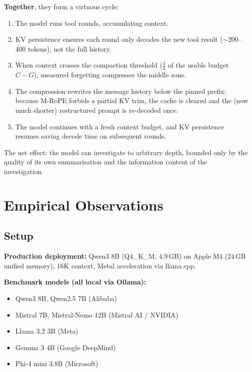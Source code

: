 \documentclass[11pt,a4paper]{article}
\begin{document}
\textbf{Together}, they form a virtuous cycle:

\begin{enumerate}
  \item The model runs tool rounds, accumulating context.
  \item KV persistence ensures each round only decodes the new tool result ($\sim$200--400 tokens), not the full history.
  \item When context crosses the compaction threshold ($\frac{3}{4}$ of the usable budget $C-G$), measured forgetting compresses the middle zone.
  \item The compression rewrites the message history below the pinned prefix; because M-RoPE forbids a partial KV trim, the cache is cleared and the (now much shorter) restructured prompt is re-decoded once.
  \item The model continues with a fresh context budget, and KV persistence resumes saving decode time on subsequent rounds.
\end{enumerate}

\noindent The net effect: the model can investigate to arbitrary depth, bounded only by the quality of its own summarisation and the information content of the investigation.

\section{Empirical Observations}

\subsection{Setup}

\textbf{Production deployment:} Qwen3 8B (Q4\_K\_M, 4.9\,GB) on Apple M4 (24\,GB unified memory), 16K context, Metal acceleration via llama.cpp.

\textbf{Benchmark models (all local via Ollama):}
\begin{itemize}[nosep]
  \item Qwen3 8B, Qwen2.5 7B (Alibaba)
  \item Mistral 7B, Mistral-Nemo 12B (Mistral AI / NVIDIA)
  \item Llama 3.2 3B (Meta)
  \item Gemma 3 4B (Google DeepMind)
  \item Phi-4 mini 3.8B (Microsoft)
\end{itemize}
\end{document}
